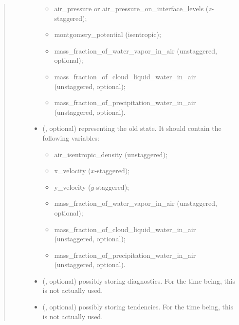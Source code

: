 \documentclass[letterpaper,10pt,english]{sphinxmanual}
\begin{document}
\begin{fulllineitems}
\begin{fulllineitems}
\begin{quote}
\begin{description}
\begin{itemize}
\begin{itemize}
\item {} 
air\_pressure or air\_pressure\_on\_interface\_levels (\(z\)-staggered);

\item {} 
montgomery\_potential (isentropic);

\item {} 
mass\_fraction\_of\_water\_vapor\_in\_air (unstaggered, optional);

\item {} 
mass\_fraction\_of\_cloud\_liquid\_water\_in\_air (unstaggered, optional);

\item {} 
mass\_fraction\_of\_precipitation\_water\_in\_air (unstaggered, optional).

\end{itemize}


\item {} 
 (, optional) \textendash{} 
{\hyperref[\detokenize{api:storages.state_isentropic.StateIsentropic}]{}} representing the old state.
It should contain the following variables:
\begin{itemize}
\item {} 
air\_isentropic\_density (unstaggered);

\item {} 
x\_velocity (\(x\)-staggered);

\item {} 
y\_velocity (\(y\)-staggered);

\item {} 
mass\_fraction\_of\_water\_vapor\_in\_air (unstaggered, optional);

\item {} 
mass\_fraction\_of\_cloud\_liquid\_water\_in\_air (unstaggered, optional);

\item {} 
mass\_fraction\_of\_precipitation\_water\_in\_air (unstaggered, optional).

\end{itemize}


\item {} 
 (, optional) \textendash{} {\hyperref[\detokenize{api:storages.grid_data.GridData}]{}} possibly storing diagnostics.
For the time being, this is not actually used.

\item {} 
 (, optional) \textendash{} {\hyperref[\detokenize{api:storages.grid_data.GridData}]{}} possibly storing tendencies.
For the time being, this is not actually used.


\end{itemize}
\end{description}
\end{quote}
\end{fulllineitems}
\end{fulllineitems}
\end{document}
